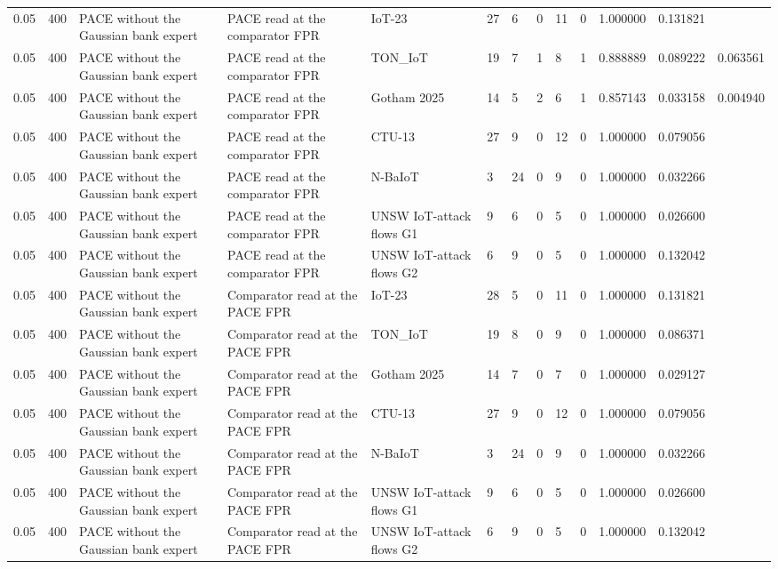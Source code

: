 \begin{tabular}{lllllllllllll}
0.05 & 400 & PACE without the Gaussian bank expert & PACE read at the comparator FPR & IoT-23 & 27 & 6 & 0 & 11 & 0 & 1.000000 & 0.131821 &  \\
0.05 & 400 & PACE without the Gaussian bank expert & PACE read at the comparator FPR & TON\_IoT & 19 & 7 & 1 & 8 & 1 & 0.888889 & 0.089222 & 0.063561 \\
0.05 & 400 & PACE without the Gaussian bank expert & PACE read at the comparator FPR & Gotham 2025 & 14 & 5 & 2 & 6 & 1 & 0.857143 & 0.033158 & 0.004940 \\
0.05 & 400 & PACE without the Gaussian bank expert & PACE read at the comparator FPR & CTU-13 & 27 & 9 & 0 & 12 & 0 & 1.000000 & 0.079056 &  \\
0.05 & 400 & PACE without the Gaussian bank expert & PACE read at the comparator FPR & N-BaIoT & 3 & 24 & 0 & 9 & 0 & 1.000000 & 0.032266 &  \\
0.05 & 400 & PACE without the Gaussian bank expert & PACE read at the comparator FPR & UNSW IoT-attack flows G1 & 9 & 6 & 0 & 5 & 0 & 1.000000 & 0.026600 &  \\
0.05 & 400 & PACE without the Gaussian bank expert & PACE read at the comparator FPR & UNSW IoT-attack flows G2 & 6 & 9 & 0 & 5 & 0 & 1.000000 & 0.132042 &  \\
0.05 & 400 & PACE without the Gaussian bank expert & Comparator read at the PACE FPR & IoT-23 & 28 & 5 & 0 & 11 & 0 & 1.000000 & 0.131821 &  \\
0.05 & 400 & PACE without the Gaussian bank expert & Comparator read at the PACE FPR & TON\_IoT & 19 & 8 & 0 & 9 & 0 & 1.000000 & 0.086371 &  \\
0.05 & 400 & PACE without the Gaussian bank expert & Comparator read at the PACE FPR & Gotham 2025 & 14 & 7 & 0 & 7 & 0 & 1.000000 & 0.029127 &  \\
0.05 & 400 & PACE without the Gaussian bank expert & Comparator read at the PACE FPR & CTU-13 & 27 & 9 & 0 & 12 & 0 & 1.000000 & 0.079056 &  \\
0.05 & 400 & PACE without the Gaussian bank expert & Comparator read at the PACE FPR & N-BaIoT & 3 & 24 & 0 & 9 & 0 & 1.000000 & 0.032266 &  \\
0.05 & 400 & PACE without the Gaussian bank expert & Comparator read at the PACE FPR & UNSW IoT-attack flows G1 & 9 & 6 & 0 & 5 & 0 & 1.000000 & 0.026600 &  \\
0.05 & 400 & PACE without the Gaussian bank expert & Comparator read at the PACE FPR & UNSW IoT-attack flows G2 & 6 & 9 & 0 & 5 & 0 & 1.000000 & 0.132042 &  \\

\end{tabular}
